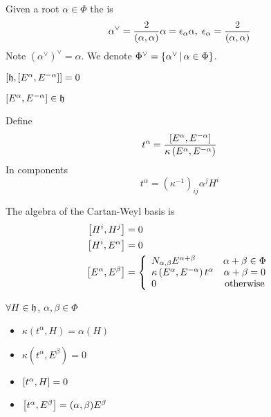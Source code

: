 \documentclass{article}
\begin{document}
\begin{definition}[Coroots]
	Given a root $\alpha\in\Phi$ the  is 
	\[
	\alpha^\vee=\frac{2}{(\alpha,\alpha)}\alpha = \eps_\alpha \alpha, \; \eps_\alpha = \frac{2}{(\alpha,\alpha)}
	\]
	Note $\left( \alpha^\vee \right)^\vee=\alpha$. We denote $\Phi^\vee = \pbrace{\alpha^\vee \, | \, \alpha \in \Phi}$. 
\end{definition}

\begin{lemma}
	$\comm[\mf{h}]{\comm[E^\alpha]{E^{-\alpha}}}=0$
\end{lemma}
\begin{corollary}
	$\comm[E^\alpha]{E^{-\alpha}} \in \mf{h}$
\end{corollary}

\begin{definition}[$t^\alpha$]
	Define 
	\[
	t^\alpha = \frac{\comm[E^\alpha]{E^{-\alpha}}}{\kappa\left(E^\alpha,E^{-\alpha}\right)}
	\]
	In components
	\[
	t^\alpha = \left( \kappa^{-1}\right)_{ij} \alpha^j H^i
	\]
\end{definition}

\begin{theorem}
	The algebra of the Cartan-Weyl basis is 
	\begin{align*}
	\comm[H^i]{H^j} &= 0 \\
	\comm[H^i]{E^\alpha} &= 0 \\
	\comm[E^\alpha]{E^\beta} &= \left\{ \begin{array}{lc} N_{\alpha,\beta}E^{\alpha+\beta} & \alpha+\beta\in\Phi \\
	\kappa\left(E^\alpha,E^{-\alpha}\right)t^\alpha & \alpha+\beta=0 \\
	0 & \text{otherwise}
	\end{array} \right. \\
	\end{align*}
\end{theorem}

\begin{fact}
	$\forall H\in\mf{h}$, $\alpha,\beta\in\Phi$
	\begin{itemize}
		\item $\kappa\left(t^\alpha,H\right)=\alpha(H)$
		\item $\kappa\left(t^\alpha,E^\beta\right)=0$
		\item $\comm[t^\alpha]{H}=0$
		\item $\comm[t^\alpha]{E^\beta}=(\alpha,\beta)E^\beta$
	\end{itemize}
\end{fact}
\end{document}
